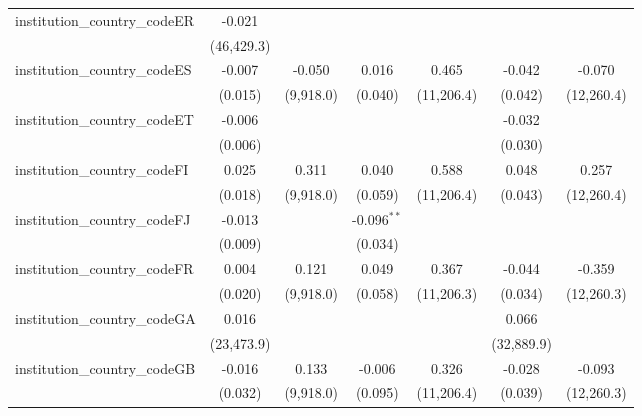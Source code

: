 \begin{tabular}{lcccccc}
   institution\_country\_codeER          & -0.021         &               &               &              &              &   \\   
                                         & (46,429.3)     &               &               &              &              &   \\   
   institution\_country\_codeES          & -0.007         & -0.050        & 0.016         & 0.465        & -0.042       & -0.070\\   
                                         & (0.015)        & (9,918.0)     & (0.040)       & (11,206.4)   & (0.042)      & (12,260.4)\\   
   institution\_country\_codeET          & -0.006         &               &               &              & -0.032       &   \\   
                                         & (0.006)        &               &               &              & (0.030)      &   \\   
   institution\_country\_codeFI          & 0.025          & 0.311         & 0.040         & 0.588        & 0.048        & 0.257\\   
                                         & (0.018)        & (9,918.0)     & (0.059)       & (11,206.4)   & (0.043)      & (12,260.4)\\   
   institution\_country\_codeFJ          & -0.013         &               & -0.096$^{**}$ &              &              &   \\   
                                         & (0.009)        &               & (0.034)       &              &              &   \\   
   institution\_country\_codeFR          & 0.004          & 0.121         & 0.049         & 0.367        & -0.044       & -0.359\\   
                                         & (0.020)        & (9,918.0)     & (0.058)       & (11,206.3)   & (0.034)      & (12,260.3)\\   
   institution\_country\_codeGA          & 0.016          &               &               &              & 0.066        &   \\   
                                         & (23,473.9)     &               &               &              & (32,889.9)   &   \\   
   institution\_country\_codeGB          & -0.016         & 0.133         & -0.006        & 0.326        & -0.028       & -0.093\\   
                                         & (0.032)        & (9,918.0)     & (0.095)       & (11,206.4)   & (0.039)      & (12,260.3)\\   

\end{tabular}
